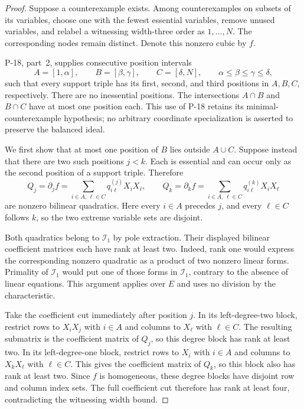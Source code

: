 \begin{proof}
Suppose a counterexample exists. Among counterexamples on
subsets of its variables, choose one with the fewest essential
variables, remove unused variables, and relabel a witnessing
width-three order as $1,\ldots,N$. The corresponding nodes
remain distinct. Denote this nonzero cubic by $f$.

P-18, part~2, supplies consecutive position intervals
\[
 A=[1,\alpha],\qquad B=[\beta,\gamma],\qquad
 C=[\delta,N],\qquad
 \alpha\le\beta\le\gamma\le\delta,
 \tag{P19.3}
\]
such that every support triple has its first, second, and third
positions in $A,B,C$, respectively. There are no inessential
positions. The intersections $A\cap B$ and $B\cap C$ have
at most one position each. This use of P-18 retains its
minimal-counterexample hypothesis; no arbitrary coordinate
specialization is asserted to preserve the balanced ideal.

We first show that at most one position of $B$ lies outside
$A\cup C$. Suppose instead that there are two such positions
$j<k$. Each is essential and can occur only as the second
position of a support triple. Therefore
\[
 Q_j=\partial_j f
   =\sum_{i\in A,\,\ell\in C}q^{(j)}_{i\ell}X_iX_\ell,
 \qquad
 Q_k=\partial_k f
   =\sum_{i\in A,\,\ell\in C}q^{(k)}_{i\ell}X_iX_\ell
 \tag{P19.4}
\]
are nonzero bilinear quadratics. Here every $i\in A$ precedes
$j$, and every $\ell\in C$ follows $k$, so the two extreme
variable sets are disjoint.

Both quadratics belong to $\mathcal I_1$ by pole extraction.
Their displayed bilinear coefficient matrices each have rank
at least two. Indeed, rank one would express the corresponding
nonzero quadratic as a product of two nonzero linear forms.
Primality of $\mathcal I_1$ would put one of those forms in
$\mathcal I_1$, contrary to the absence of linear equations.
This argument applies over $E$ and uses no division by the
characteristic.

Take the coefficient cut immediately after position $j$.
In its left-degree-two block, restrict rows to $X_iX_j$ with
$i\in A$ and columns to $X_\ell$ with $\ell\in C$.
The resulting submatrix is the coefficient matrix of $Q_j$,
so this degree block has rank at least two. In its
left-degree-one block, restrict rows to $X_i$ with $i\in A$
and columns to $X_kX_\ell$ with $\ell\in C$. This gives the
coefficient matrix of $Q_k$, so this block also has rank at
least two. Since $f$ is homogeneous, these degree blocks
have disjoint row and column index sets. The full coefficient
cut therefore has rank at least four, contradicting the
witnessing width bound.


\end{proof}
